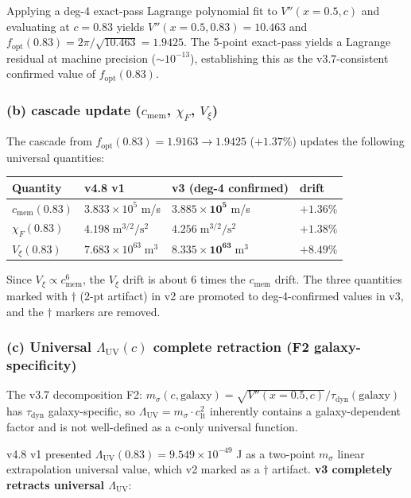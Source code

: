 \documentclass[11pt,a4paper]{article}
\newcommand{\cmem}{c_{\mathrm{mem}}}
\newcommand{\Vxi}{V_{\xi}}
\newcommand{\Lambdauv}{\Lambda_{\mathrm{UV}}}
\newcommand{\msigma}{m_{\sigma}}
\newcommand{\clt}{c_{\mathrm{lt}}}
\newcommand{\fopt}{f_{\mathrm{opt}}}
\begin{document}
Applying a deg-4 exact-pass Lagrange polynomial fit to $V''(x=0.5, c)$ and evaluating at
$c=0.83$ yields $V''(x=0.5, 0.83) = 10.463$ and $\fopt(0.83) = 2\pi/\sqrt{10.463} = 1.9425$.
The 5-point exact-pass yields a Lagrange residual at machine precision ($\sim 10^{-13}$),
establishing this as the v3.7-consistent confirmed value of $\fopt(0.83)$.

\subsubsection*{(b) cascade update ($\cmem$, $\chi_F$, $\Vxi$)}

The cascade from $\fopt(0.83) = 1.9163 \to 1.9425$ ($+1.37\%$) updates the following universal
quantities:

\begin{center}\small
\begin{tabular}{@{}llll@{}}
\toprule
Quantity & v4.8 v1 & v3 (deg-4 confirmed) & drift \\
\midrule
$\cmem(0.83)$ & $3.833 \times 10^{5}$ m/s & $\mathbf{3.885 \times 10^{5}}$ m/s & $+1.36\%$ \\
$\chi_F(0.83)$ & $4.198\;\mathrm{m}^{3/2}/\mathrm{s}^2$ & $\mathbf{4.256}\;\mathrm{m}^{3/2}/\mathrm{s}^2$ & $+1.38\%$ \\
$\Vxi(0.83)$ & $7.683 \times 10^{63}\;\mathrm{m}^3$ & $\mathbf{8.335 \times 10^{63}}\;\mathrm{m}^3$ & $+8.49\%$ \\
\bottomrule
\end{tabular}
\end{center}

Since $\Vxi \propto \cmem^6$, the $\Vxi$ drift is about 6 times the $\cmem$ drift. The three
quantities marked with ${\dagger}$ (2-pt artifact) in v2 are promoted to deg-4-confirmed values
in v3, and the ${\dagger}$ markers are removed.

\subsubsection*{(c) Universal $\Lambdauv(c)$ complete retraction (F2 galaxy-specificity)}

The v3.7 decomposition F2: $\msigma(c, \mathrm{galaxy}) = \sqrt{V''(x=0.5, c)}/\tau_{\mathrm{dyn}}(\mathrm{galaxy})$
has $\tau_{\mathrm{dyn}}$ galaxy-specific, so $\Lambdauv = \msigma \cdot \clt^2$ inherently
contains a galaxy-dependent factor and is not well-defined as a c-only universal function.

v4.8 v1 presented $\Lambdauv(0.83) = 9.549 \times 10^{-49}$ J as a two-point $\msigma$ linear
extrapolation universal value, which v2 marked as a ${\dagger}$ artifact.
\textbf{v3 completely retracts universal $\Lambdauv$}:
\end{document}
